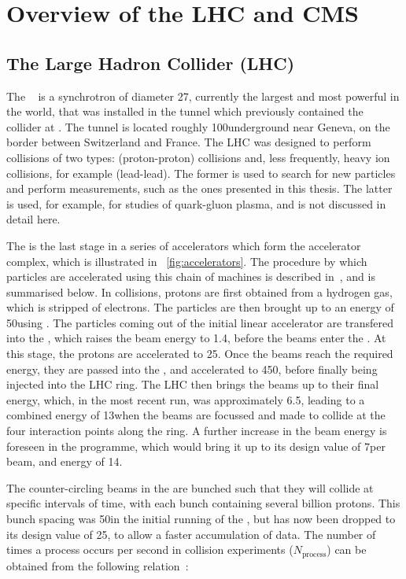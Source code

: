 \chapter{Overview of the LHC and CMS}
\label{chap:detector}
\section{The Large Hadron Collider (LHC)}
\label{sec:lhc}
The \LHC~\cite{LHC_machine} is a synchrotron of diameter 27\km, currently the largest and most powerful in the world, that was installed in the tunnel which previously contained the \LEP~\cite{lepdesign} collider at \CERN. The tunnel is located roughly 100\m underground near Geneva, on the border between Switzerland and France. The LHC was designed to perform collisions of two types: \pp (proton-proton) collisions and, less frequently, heavy ion collisions, for example \PbPb (lead-lead). The former is used to search for new particles and perform \SM measurements, such as the ones presented in this thesis. The latter is used, for example, for studies of quark-gluon plasma, and is not discussed in detail here. 

The \LHC is the last stage in a series of accelerators which form the \CERN accelerator complex, which is illustrated in \Fig~\ref{fig:accelerators}. The procedure by which particles are accelerated using this chain of machines is described in~\cite{LHC_machine}, and is summarised below. In \pp collisions, protons are first obtained from a hydrogen gas, which is stripped of electrons. The particles are then brought up to an energy of 50\MeV using \LINACTWO. The particles coming out of the initial linear accelerator are transfered into the \Booster, which raises the beam energy to 1.4\GeV, before the beams enter the \PS. At this stage, the protons are accelerated to 25\GeV. Once the beams reach the required energy, they are passed into the \SPS, and accelerated to 450\GeV, before finally being injected into the LHC ring. The LHC then brings the beams up to their final energy, which, in the most recent run, was approximately 6.5\TeV, leading to a combined \CoM energy of 13\TeV when the beams are focussed and made to collide at the four interaction points along the ring. A further increase in the beam energy is foreseen in the \LHC programme, which would bring it up to its design value of 7\TeV per beam, and \CoM energy of 14\TeV.

The counter-circling beams in the \LHC are bunched such that they will collide at specific intervals of time, with each bunch containing several billion protons. This bunch spacing was 50\ns in the initial running of the \LHC, but has now been dropped to its design value of 25\ns, to allow a faster accumulation of data. The number of times a process occurs per second in collision experiments ($N_{\text{process}}$) can be obtained from the following relation~\cite{Benedikt:823808}:

